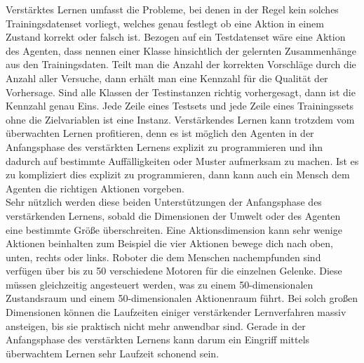 Verstärktes Lernen umfasst die Probleme, bei denen in der Regel kein solches Trainingsdatenset vorliegt, welches genau festlegt ob eine Aktion in einem Zustand korrekt oder falsch ist. Bezogen auf ein Testdatenset wäre eine Aktion des Agenten, dass nennen einer Klasse hinsichtlich der gelernten Zusammenhänge aus den Trainingsdaten. Teilt man die Anzahl der korrekten Vorschläge durch die Anzahl aller Versuche, dann erhält man eine Kennzahl für die Qualität der Vorhersage. Sind alle Klassen der Testinstanzen richtig vorhergesagt, dann ist die Kennzahl genau Eins. Jede Zeile eines Testsets und jede Zeile eines Trainingssets ohne die Zielvariablen ist eine Instanz. Verstärkendes Lernen kann trotzdem vom überwachten Lernen profitieren, denn es ist möglich den Agenten in der Anfangsphase des verstärkten Lernens explizit zu programmieren und ihn dadurch auf bestimmte Auffälligkeiten oder Muster aufmerksam zu machen. Ist es zu kompliziert dies explizit zu programmieren, dann kann auch ein Mensch dem Agenten die richtigen Aktionen vorgeben. \\

Sehr nützlich werden diese beiden Unterstützungen der Anfangsphase des verstärkenden Lernens, sobald die Dimensionen der Umwelt oder des Agenten eine bestimmte Größe überschreiten. Eine Aktionsdimension kann sehr wenige Aktionen beinhalten zum Beispiel die vier Aktionen bewege dich nach oben, unten, rechts oder links. Roboter die dem Menschen nachempfunden sind verfügen über bis zu 50 verschiedene Motoren für die einzelnen Gelenke. Diese müssen gleichzeitig angesteuert werden, was zu einem 50-dimensionalen Zustandsraum und einem 50-dimensionalen Aktionenraum führt\cite[\acs{vgl.} 305\psq]{Ertel}. Bei solch großen Dimensionen können die Laufzeiten einiger verstärkender Lernverfahren massiv ansteigen, bis sie praktisch nicht mehr anwendbar sind. Gerade in der Anfangsphase des verstärkten Lernens kann darum ein Eingriff mittels überwachtem Lernen sehr Laufzeit schonend sein.